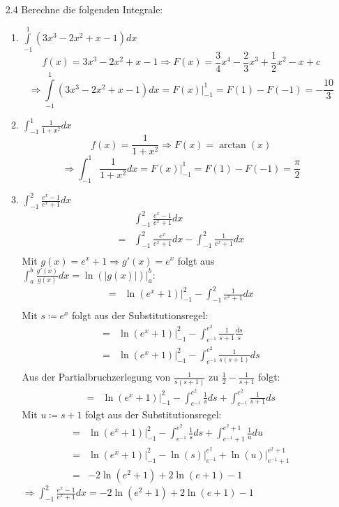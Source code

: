 \documentclass{HM}
\begin{document}
	\begin{enumerate}
		\item[2.4] Berechne die folgenden Integrale:
		\begin{enumerate}
			\item $\int\limits_{-1}^1(3x^3-2x^2+x-1)dx$
			$$f(x)=3x^3-2x^2+x-1 \Rightarrow F(x)=\frac{3}{4}x^4-\frac{2}{3}x^3+\frac{1}{2}x^2-x+c$$
			$$\Rightarrow\int\limits_{-1}^1(3x^3-2x^2+x-1)dx = F(x)\biggr|_{-1}^1 = F(1)-F(-1) = -\frac{10}{3}$$
			\item $\int_{-1}^1\frac{1}{1+x^2}dx$
			$$f(x)=\frac{1}{1+x^2} \Rightarrow F(x)=\arctan(x)$$
			$$\Rightarrow\int_{-1}^1\frac{1}{1+x^2}dx=F(x)\biggr|_{-1}^1 = F(1)-F(-1)=\frac{\pi}{2}$$
			\item $\int_{-1}^2\frac{e^x-1}{e^x+1}dx$
			\begin{align*}
				&\int_{-1}^2\frac{e^x-1}{e^x+1}dx\\
				=&\int_{-1}^2\frac{e^x}{e^x+1}dx-\int_{-1}^2\frac{1}{e^x+1}dx\\
			\end{align*}
			Mit $g(x)=e^x+1\Rightarrow g'(x)=e^x$ folgt aus $\int_a^b\frac{g'(x)}{g(x)}dx = \ln(|g(x)|)\biggr|_a^b$:
			\begin{align*}
				=&\ln(e^x+1)\biggr|_{-1}^2-\int_{-1}^2\frac{1}{e^x+1}dx\\
			\end{align*}
			Mit $s\coloneqq e^x$ folgt aus der Substitutionsregel:
			\begin{align*}
				=&\ln(e^x+1)\biggr|_{-1}^2-\int_{e^{-1}}^{e^2}\frac{1}{s+1}\frac{ds}{s}\\
				=&\ln(e^x+1)\biggr|_{-1}^2-\int_{e^{-1}}^{e^2}\frac{1}{s(s+1)}ds\\
			\end{align*}
			Aus der Partialbruchzerlegung von $\frac{1}{s(s+1)}$ zu $\frac{1}{2}-\frac{1}{s+1}$ folgt:
			\begin{align*}
				=&\ln(e^x+1)\biggr|_{-1}^2-\int_{e^{-1}}^{e^2}\frac{1}{s}ds+\int_{e^{-1}}^{e^2}\frac{1}{s+1}ds
			\end{align*}
			Mit $u\coloneqq s+1$ folgt aus der Substitutionsregel:
			\begin{align*}
				=&\ln(e^x+1)\biggr|_{-1}^2-\int_{e^{-1}}^{e^2}\frac{1}{s}ds+\int_{e^{-1}+1}^{e^2+1}\frac{1}{u}du\\
				=&\ln(e^x+1)\biggr|_{-1}^2-\ln(s)\biggr|_{e^{-1}}^{e^2}+\ln(u)\biggr|_{e^{-1}+1}^{e^2+1}\\
				=&-2\ln(e^2+1)+2\ln(e+1)-1
			\end{align*}
			$\Rightarrow \int_{-1}^2\frac{e^x-1}{e^x+1}dx=-2\ln(e^2+1)+2\ln(e+1)-1$
		\end{enumerate}
	\end{enumerate}
\end{document}
